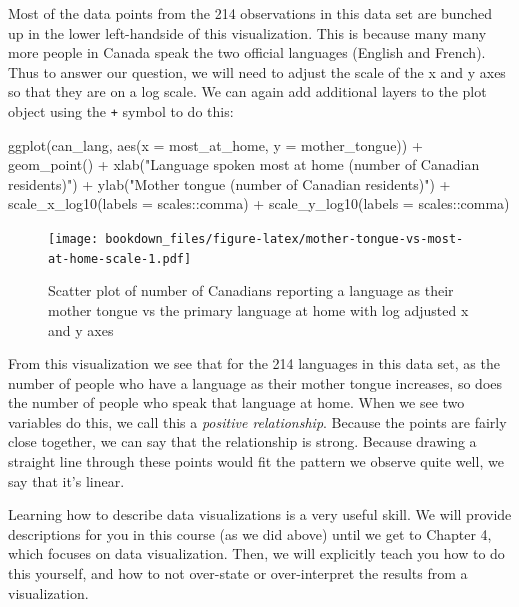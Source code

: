 \documentclass[
]{krantz}
\makeatletter
\newenvironment{Shaded}{\begin{snugshade}}{\end{snugshade}}
\newcommand{\AttributeTok}[1]{\textcolor[rgb]{0.61,0.61,0.61}{#1}}
\newcommand{\FunctionTok}[1]{\textcolor[rgb]{0,0,0}{#1}}
\newcommand{\NormalTok}[1]{#1}
\newcommand{\SpecialCharTok}[1]{\textcolor[rgb]{0,0,0}{#1}}
\newcommand{\StringTok}[1]{\textcolor[rgb]{0.5,0.5,0.5}{#1}}
\newenvironment{kframe}{%
\medskip{}
\setlength{\fboxsep}{.8em}
 \def\at@end@of@kframe{}%
 \ifinner\ifhmode%
  \def\at@end@of@kframe{\end{minipage}}%
  \begin{minipage}{\columnwidth}%
 \fi\fi%
 \def\FrameCommand##1{\hskip\@totalleftmargin \hskip-\fboxsep
 \colorbox{shadecolor}{##1}\hskip-\fboxsep
     \hskip-\linewidth \hskip-\@totalleftmargin \hskip\columnwidth}%
 \MakeFramed {\advance\hsize-\width
   \@totalleftmargin\z@ \linewidth\hsize
   \@setminipage}}%
 {\par\unskip\endMakeFramed%
 \at@end@of@kframe}
\renewenvironment{Shaded}{\begin{kframe}}{\end{kframe}}
\makeatother
\begin{document}
Most of the data points from the 214 observations in this data set are bunched up in the lower left-handside of this visualization. This is because many many more people in Canada speak the two official languages (English and French). Thus to answer our question, we will need to adjust the scale of the x and y axes so that they are on a log scale. We can again add additional layers to the plot object using the \texttt{+} symbol to do this:

\begin{Shaded}
\begin{Highlighting}[]
\FunctionTok{ggplot}\NormalTok{(can\_lang, }\FunctionTok{aes}\NormalTok{(}\AttributeTok{x =}\NormalTok{ most\_at\_home, }\AttributeTok{y =}\NormalTok{ mother\_tongue)) }\SpecialCharTok{+}
  \FunctionTok{geom\_point}\NormalTok{() }\SpecialCharTok{+}
  \FunctionTok{xlab}\NormalTok{(}\StringTok{"Language spoken most at home (number of Canadian residents)"}\NormalTok{) }\SpecialCharTok{+}
  \FunctionTok{ylab}\NormalTok{(}\StringTok{"Mother tongue (number of Canadian residents)"}\NormalTok{) }\SpecialCharTok{+}
  \FunctionTok{scale\_x\_log10}\NormalTok{(}\AttributeTok{labels =}\NormalTok{ scales}\SpecialCharTok{::}\NormalTok{comma) }\SpecialCharTok{+}
  \FunctionTok{scale\_y\_log10}\NormalTok{(}\AttributeTok{labels =}\NormalTok{ scales}\SpecialCharTok{::}\NormalTok{comma)}
\end{Highlighting}
\end{Shaded}

\begin{figure}
\centering
\texttt{[image: bookdown\_files/figure-latex/mother-tongue-vs-most-at-home-scale-1.pdf]}
\caption{\label{fig:mother-tongue-vs-most-at-home-scale}Scatter plot of number of Canadians reporting a language as their mother tongue vs the primary language at home with log adjusted x and y axes}
\end{figure}

From this visualization we see that for the 214 languages in this data set, as the number of people who have a language as their mother tongue increases, so does the number of people who speak that language at home. When we see
two variables do this, we call this a \emph{positive relationship}. Because the points are fairly close together, we can say that the relationship is strong. Because drawing a straight line through these
points would fit the pattern we observe quite well, we say that it's linear.

Learning how to describe data visualizations is a very useful skill. We will provide descriptions for you in this course (as we did above) until we get to Chapter 4,
which focuses on data visualization. Then, we will explicitly teach you how to do this yourself, and how to not over-state or over-interpret the results
from a visualization.
\end{document}
